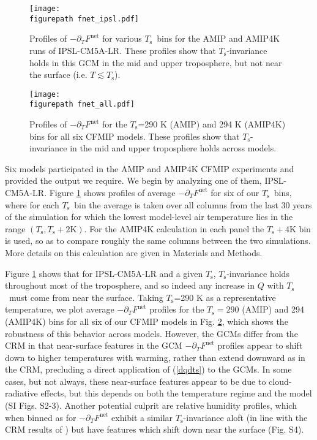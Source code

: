 \documentclass[9pt,twocolumn,twoside,lineno]{pnas-new}
\newcommand{\eqnref}[1]{(\ref{#1})}
\newcommand{\ppt}{\ensuremath{\partial_T}}
\newcommand{\Fnet}{\ensuremath{F^\mathrm{net}}}
\newcommand{\Kelvin}{\ensuremath{\mathrm{K}}}
\newcommand{\Ts}{\ensuremath{T_\mathrm{s}}}
\newcommand{\figurepath}{../../figures/}
\begin{document}
\begin{figure}[t]
	\begin{center}
			\texttt{[image: \\figurepath fnet\_ipsl.pdf]}
		\caption{ Profiles of $-\ppt \Fnet$ for various \Ts\ bins for the AMIP and AMIP4K runs of IPSL-CM5A-LR.  These profiles show that \Ts-invariance holds in this GCM in the mid and upper troposphere, but not near the surface (i.e. $T \lesssim \Ts$).
		\label{fnet_ipsl}
		}
	\end{center}
\end{figure}


\begin{figure}[t]
	\begin{center}
			\texttt{[image: \\figurepath fnet\_all.pdf]}
		\caption{ Profiles of $-\ppt \Fnet$ for the \Ts=290 K (AMIP) and 294 K (AMIP4K) bins for all six CFMIP models. These profiles show that \Ts-invariance in the mid and upper troposphere holds across models.
		\label{fnet_all}
		}
	\end{center}
\end{figure}

Six models participated in the AMIP and AMIP4K CFMIP experiments and provided the output we require. We begin by analyzing one of them, IPSL-CM5A-LR. Figure \ref{fnet_ipsl} shows  profiles of average $-\ppt \Fnet$ for six of our \Ts\ bins, where for each \Ts\ bin the average is taken over  all columns from the last 30 years of the simulation for which the lowest model-level air temperature lies in the range $(\Ts,\Ts +2\Kelvin)$. For the AMIP4K calculation in each panel the $\Ts +4\Kelvin$ bin is used, so as to compare roughly the same columns between the two simulations. More details on this calculation are given in Materials and Methods.

 Figure \ref{fnet_ipsl} shows that for IPSL-CM5A-LR and a given \Ts, \Ts-invariance holds throughout most of the troposphere, and so indeed any increase in $Q$ with \Ts\ must come from near the surface. Taking \Ts=290 K as a representative temperature, we plot average $-\ppt \Fnet$ profiles for the $\Ts= 290$ (AMIP) and 294 (AMIP4K) bins  for all six of our  CFMIP models in Fig. \ref{fnet_all}, which shows the robustness of this behavior across models. However, the GCMs differ from the CRM in that near-surface features in the GCM $-\ppt \Fnet$ profiles appear to shift down to higher temperatures with  warming, rather than extend downward as in the CRM, precluding a direct application of \eqnref{dqdts} to the GCMs. In some cases, but not always, these near-surface features appear to be due to cloud-radiative effects, but this depends on both the temperature regime and the model (SI Figs. S2-3). Another potential culprit are relative humidity profiles, which when binned as for $-\ppt \Fnet$ exhibit a similar \Ts-invariance aloft (in line with the CRM results of \cite{romps2014}) but have features which shift down near the surface (Fig. S4).
  
\end{document}
